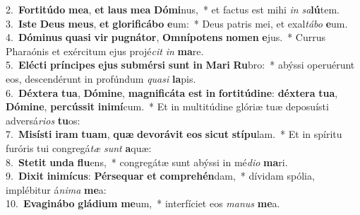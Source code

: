 {2.~}\textbf{For}\textbf{ti}\textbf{tú}\textbf{do} \textbf{me}\textbf{a}, \textbf{et} \textbf{laus} \textbf{me}\textbf{a} \textbf{Dó}\textbf{mi}nus,~* et factus est mihi \textit{in} \textit{sa}\textbf{lú}tem.\\
{3.~}\textbf{I}\textbf{ste} \textbf{De}\textbf{us} \textbf{me}\textbf{us}, \textbf{et} \textbf{glo}\textbf{ri}\textbf{fi}\textbf{cá}\textbf{bo} \textbf{e}um:~* Deus patris mei, et exal\textit{tá}\textit{bo} \textbf{e}um.\\
{4.~}\textbf{Dó}\textbf{mi}\textbf{nus} \textbf{qua}\textbf{si} \textbf{vir} \textbf{pu}\textbf{gná}\textbf{tor}, \textbf{Om}\textbf{ní}\textbf{po}\textbf{tens} \textbf{no}\textbf{men} \textbf{e}jus.~* Currus Pharaónis et exércitum ejus projé\textit{cit} \textit{in} \textbf{ma}re.\\
{5.~}\textbf{E}\textbf{lé}\textbf{cti} \textbf{prín}\textbf{ci}\textbf{pes} \textbf{e}\textbf{jus} \textbf{sub}\textbf{mér}\textbf{si} \textbf{sunt} \textbf{in} \textbf{Ma}\textbf{ri} \textbf{Ru}bro:~* abýssi operuérunt eos, descendérunt in profúndum \textit{qua}\textit{si} \textbf{la}pis.\\
{6.~}\textbf{Déx}\textbf{te}\textbf{ra} \textbf{tu}\textbf{a}, \textbf{Dó}\textbf{mi}\textbf{ne}, \textbf{ma}\textbf{gni}\textbf{fi}\textbf{cá}\textbf{ta} \textbf{est} \textbf{in} \textbf{for}\textbf{ti}\textbf{tú}\textbf{di}\textbf{ne}: \textbf{déx}\textbf{te}\textbf{ra} \textbf{tu}\textbf{a}, \textbf{Dó}\textbf{mi}\textbf{ne}, \textbf{per}\textbf{cús}\textbf{sit} \textbf{i}\textbf{ni}\textbf{mí}cum.~* Et in multitúdine glóriæ tuæ deposuísti adversá\textit{ri}\textit{os} \textbf{tu}os:\\
{7.~}\textbf{Mi}\textbf{sí}\textbf{sti} \textbf{i}\textbf{ram} \textbf{tu}\textbf{am}, \textbf{quæ} \textbf{de}\textbf{vo}\textbf{rá}\textbf{vit} \textbf{e}\textbf{os} \textbf{si}\textbf{cut} \textbf{stí}\textbf{pu}lam.~* Et in spíritu furóris tui congregá\textit{tæ} \textit{sunt} \textbf{a}quæ:\\
{8.~}\textbf{Ste}\textbf{tit} \textbf{un}\textbf{da} \textbf{flu}ens,~* congregátæ sunt abýssi in mé\textit{di}\textit{o} \textbf{ma}ri.\\
{9.~}\textbf{Di}\textbf{xit} \textbf{i}\textbf{ni}\textbf{mí}\textbf{cus}: \textbf{Pér}\textbf{se}\textbf{quar} \textbf{et} \textbf{com}\textbf{pre}\textbf{hén}dam,~* dívidam spólia, implébitur á\textit{ni}\textit{ma} \textbf{me}a:\\
{10.~}\textbf{E}\textbf{va}\textbf{gi}\textbf{ná}\textbf{bo} \textbf{glá}\textbf{di}\textbf{um} \textbf{me}um,~* interfíciet eos \textit{ma}\textit{nus} \textbf{me}a.\\

